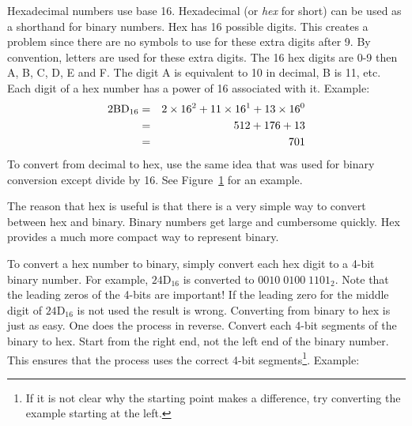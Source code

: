 Hexadecimal numbers use base 16. Hexadecimal (or \emph{hex} for short) can be
used as a shorthand for binary numbers. Hex has 16 possible
digits. This creates a problem since there are no symbols to use for
these extra digits after 9. By convention, letters are used for these
extra digits. The 16 hex digits are 0-9 then A, B, C, D, E and F. The
digit A is equivalent to 10 in decimal, B is 11, etc. Each digit of a
hex number has a power of 16 associated with it. Example:
\begin{eqnarray*}
\rm
2BD_{16} & = & 2 \times 16^2 + 11 \times 16^1 + 13 \times 16^0 \\
         & = & 512 + 176 + 13 \\
         & = & 701 \\
\end{eqnarray*}
To convert from decimal to hex, use the same idea that was used for
binary conversion except divide by 16. See Figure~\ref{fig:hex-conv} for
an example.

\begin{figure}[t]
\centering
{}
\caption{\label{fig:hex-conv}}
\end{figure}

The reason that hex is useful is that there is a very simple way to
convert between hex and binary. Binary numbers get large and
cumbersome quickly. Hex provides a much more compact way to represent
binary.

To convert a hex number to binary, simply convert each hex digit to a
4-bit binary number. For example, $\mathrm{24D}_{16}$ is converted to
\mbox{$0010\;0100\; 1101_2$}. Note that the leading zeros of the
4-bits are important! If the leading zero for the middle digit of
$\mathrm{24D}_{16}$ is not used the result is wrong. Converting from
binary to hex is just as easy. One does the process in reverse. Convert
each 4-bit segments of the binary to hex. Start from the
right end, not the left end of the binary number. This ensures that
the process uses the correct 4-bit segments\footnote{If it is not
clear why the starting point makes a difference, try converting the
example starting at the left.}. Example:\newline

